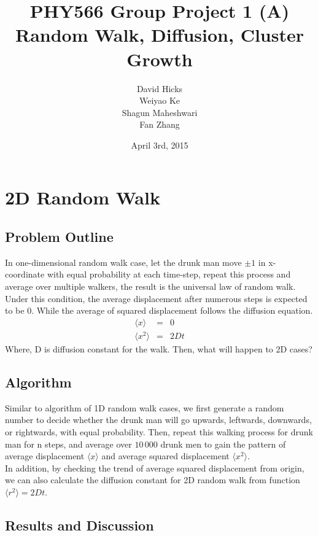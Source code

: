 \documentclass[a4paper,12pt]{article}
\begin{document}
\title{PHY566 Group Project 1 (A) \\ Random Walk, Diffusion, Cluster Growth}
\date{\small April 3rd, 2015}
\author{David Hicks\\ Weiyao Ke \\ Shagun Maheshwari \\ Fan Zhang}

\maketitle

\section{2D Random Walk}
\subsection{Problem Outline}
In one-dimensional random walk case, let the drunk man move $\pm 1$ in x-coordinate with equal probability at each time-step, repeat this process and average over multiple walkers, the result is the universal law of random walk. Under this condition, the average displacement after numerous steps is expected to be $0$. While the average of squared displacement follows the diffusion equation.
\begin{eqnarray*}
\langle x \rangle &=& 0 \\
\langle x^2 \rangle &=& 2Dt
\end{eqnarray*}
Where, D is diffusion constant for the walk. Then, what will happen to 2D cases? \\

\subsection{Algorithm}
Similar to algorithm of 1D random walk cases, we first generate a random number to decide whether the drunk man will go upwards, leftwards, downwards, or rightwards, with equal probability. Then, repeat this walking process for drunk man for n steps, and average over $10\,000$ drunk men to gain the pattern of average displacement $\langle x \rangle$ and average squared displacement $\langle x^2 \rangle$. \\
In addition, by checking the trend of average squared displacement from origin, we can also calculate the diffusion constant for 2D random walk from function $\langle r^2 \rangle = 2Dt$.

\subsection{Results and Discussion}
\end{document}
